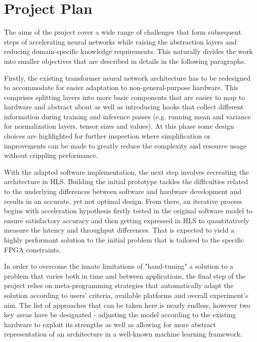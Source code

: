 \chapter{Project Plan}\label{project-plan}

The aims of the project cover a wide range of challenges that form subsequent steps of accelerating neural networks while raising the abstraction layers and reducing domain-specific knowledge requirements. This naturally divides the work into smaller objectives that are described in details in the following paragraphs.

Firstly, the existing transformer neural network architecture has to be redesigned to accommodate for easier adaptation to non-general-purpose hardware. This comprises splitting layers into more basic components that are easier to map to hardware and abstract about as well as introducing hooks that collect different information during training and inference passes (e.g. running mean and variance for normalization layers, tensor sizes and values). At this phase some design choices are highlighted for further inspection where simplification or improvements can be made to greatly reduce the complexity and resource usage without crippling performance.

With the adapted software implementation, the next step involves recreating the architecture in HLS. Building the initial prototype tackles the difficulties related to the underlying differences between software and hardware development and results in an accurate, yet not optimal design. From there, an iterative process begins with acceleration hypothesis firstly tested in the original software model to ensure satisfactory accuracy and then getting expressed in HLS to quantitatively measure the latency and throughput differences. That is expected to yield a highly performant solution to the initial problem that is tailored to the specific FPGA constraints.

In order to overcome the innate limitations of "hand-tuning" a solution to a problem that varies both in time and between applications, the final step of the project relies on meta-programming strategies that automatically adapt the solution according to users' criteria, available platforms and overall experiment's aim. The list of approaches that can be taken here is nearly endless, however two key areas have be designated - adjusting the model according to the existing hardware to exploit its strengths as well as allowing for more abstract representation of an architecture in a well-known machine learning framework.

